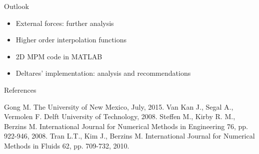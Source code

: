 \documentclass[mathserif,professionalfont,hyperref={pdfpagelabels=false}]{beamer}
\begin{document}
\begin{frame}{Outlook}
\begin{itemize}
\item External forces: further analysis 
\pause
\item Higher order interpolation functions
\pause
\item 2D MPM code in MATLAB
\pause
\item Deltares' implementation: analysis and recommendations
\end{itemize}
\end{frame}



\begin{frame}{References}
\begin{thebibliography}{22}
  Gong M.
 \newblock The University of New Mexico, July, 2015.
  Van Kan J., Segal A., Vermolen F. 
 \newblock Delft University of Technology, 2008.
  Steffen M., Kirby R. M., Berzins M. 
 \newblock International Journal for Numerical Methods in Engineering 76, pp. 922-946, 2008.
  Tran L.T., Kim J., Berzins M. 
 \newblock International Journal for Numerical Methods in Fluids 62, pp. 709-732, 2010.
\end{thebibliography}
\end{frame}







\appendix
\end{document}
